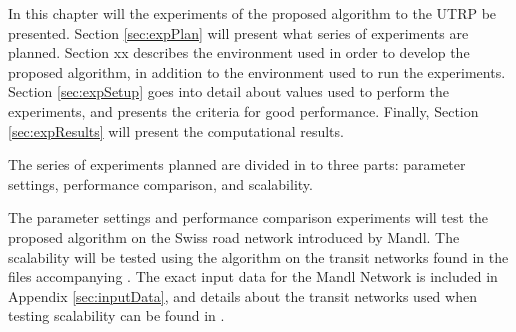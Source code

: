 In this chapter will the experiments of the proposed algorithm to the UTRP be presented. Section \vref{sec:expPlan} will present what series of experiments are planned. Section xx describes the environment used in order to develop the proposed algorithm, in addition to the environment used to run the experiments. Section \vref{sec:expSetup} goes into detail about values used to perform the experiments, and presents the criteria for good performance. Finally, Section \vref{sec:expResults} will present the computational results. 

The series of experiments planned are divided in to three parts: parameter settings, performance comparison, and scalability.

The parameter settings and performance comparison experiments will test the proposed algorithm on the Swiss road network introduced by Mandl\citep{mandl79}. The scalability will be tested using the algorithm on the transit networks found in the files accompanying \citet{mumford13}. The exact input data for the Mandl Network is included in Appendix \vref{sec:inputData}, and details about the transit networks used when testing scalability can be found in \citet{mumford13}.


 

